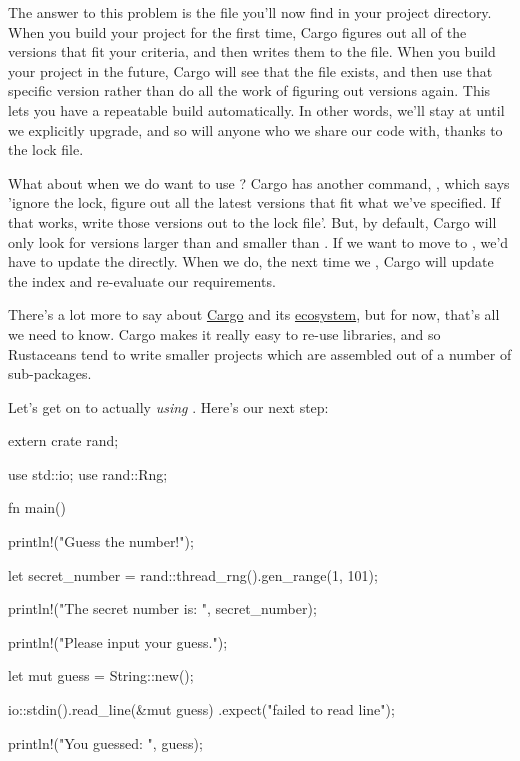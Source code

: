 \blank

The answer to this problem is the  file you'll now find in your project directory. When you build your project 
for the first time, Cargo figures out all of the versions that fit your criteria, and then writes them to the 
file. When you build your project in the future, Cargo will see that the  file exists, and then use that specific
version rather than do all the work of figuring out versions again. This lets you have a repeatable build automatically. In other
words, we'll stay at  until we explicitly upgrade, and so will anyone who we share our code with, thanks to the lock 
file.

\blank

What about when we do want to use ? Cargo has another command, , which says 'ignore the lock, figure out
all the latest versions that fit what we've specified. If that works, write those versions out to the lock file'. But, by default,
Cargo will only look for versions larger than  and smaller than . If we want to move to , we'd
have to update the  directly. When we do, the next time we , Cargo will update the index and 
re-evaluate our  requirements.

\blank

There's a lot more to say about \href{http://doc.crates.io/}{Cargo} and its \href{http://doc.crates.io/crates-io.html}{ecosystem},
but for now, that's all we need to know. Cargo makes it really easy to re-use libraries, and so Rustaceans tend to write smaller
projects which are assembled out of a number of sub-packages.

\blank

Let's get on to actually \emph{using} . Here's our next step:

\begin{rustc}
extern crate rand;

use std::io;
use rand::Rng;

fn main() {
    println!("Guess the number!");

    let secret_number = rand::thread_rng().gen_range(1, 101);

    println!("The secret number is: {}", secret_number);

    println!("Please input your guess.");

    let mut guess = String::new();

    io::stdin().read_line(&mut guess)
        .expect("failed to read line");

    println!("You guessed: {}", guess);
}
\end{rustc}

